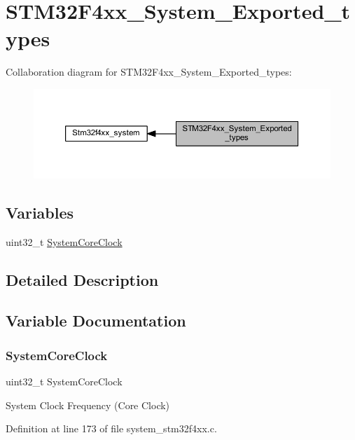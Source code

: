 \hypertarget{group___s_t_m32_f4xx___system___exported__types}{}\section{S\+T\+M32\+F4xx\+\_\+\+System\+\_\+\+Exported\+\_\+types}
\label{group___s_t_m32_f4xx___system___exported__types}
Collaboration diagram for S\+T\+M32\+F4xx\+\_\+\+System\+\_\+\+Exported\+\_\+types\+:\nopagebreak
\begin{figure}[H]
\begin{center}
\leavevmode
\includegraphics[width=350pt]{group___s_t_m32_f4xx___system___exported__types}
\end{center}
\end{figure}
\subsection*{Variables}
\begin{DoxyCompactItemize}
\item 
uint32\+\_\+t \hyperlink{group___s_t_m32_f4xx___system___exported__types_gaa3cd3e43291e81e795d642b79b6088e6}{System\+Core\+Clock}
\end{DoxyCompactItemize}


\subsection{Detailed Description}


\subsection{Variable Documentation}
\mbox{\label{group___s_t_m32_f4xx___system___exported__types_gaa3cd3e43291e81e795d642b79b6088e6}} 
\subsubsection{\texorpdfstring{System\+Core\+Clock}{SystemCoreClock}}
{\footnotesize\ttfamily uint32\+\_\+t System\+Core\+Clock}

System Clock Frequency (Core Clock) 

Definition at line 173 of file system\+\_\+stm32f4xx.\+c.

